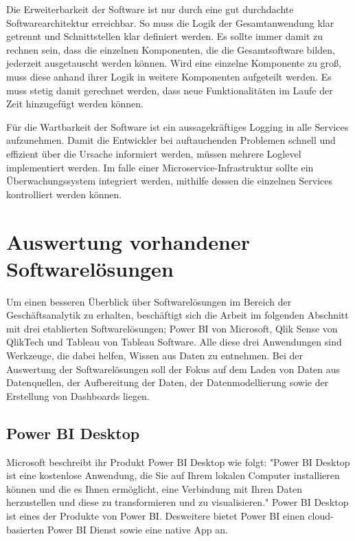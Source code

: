 Die Erweiterbarkeit der Software ist nur durch eine gut durchdachte Softwarearchitektur erreichbar.
So muss die Logik der Gesamtanwendung klar getrennt und Schnittstellen klar definiert werden. Es sollte
immer damit zu rechnen sein, dass die einzelnen Komponenten, die die Gesamtsoftware bilden, jederzeit
ausgetauscht werden können. Wird eine einzelne Komponente zu groß, muss diese anhand ihrer Logik in weitere
Komponenten aufgeteilt werden. Es muss stetig damit gerechnet werden, dass neue Funktionalitäten im
Laufe der Zeit hinzugefügt werden können.

Für die Wartbarkeit der Software ist ein aussagekräftiges Logging in alle Services aufzunehmen.
Damit die Entwickler bei auftauchenden Problemen schnell und effizient über die Ursache informiert werden,
müssen mehrere Loglevel implementiert werden. Im falle einer Microservice-Infrastruktur sollte ein Überwachungssystem
integriert werden, mithilfe dessen die einzelnen Services kontrolliert werden können.

\section{Auswertung vorhandener Softwarelösungen}
\label{sec:auswertungvorhandenersoftwareloesungen}
Um einen besseren Überblick über Softwarelösungen im Bereich der Geschäftsanalytik zu erhalten, beschäftigt sich
die Arbeit im folgenden Abschnitt mit drei etablierten Softwarelösungen; Power BI von
Microsoft, Qlik Sense von QlikTech und Tableau von Tableau Software. Alle diese drei Anwendungen sind Werkzeuge,
die dabei helfen, Wissen aus Daten zu entnehmen. Bei der Auswertung der Softwarelösungen soll der Fokus auf dem Laden
von Daten aus Datenquellen, der Aufbereitung der Daten, der Datenmodellierung sowie der Erstellung von Dashboards liegen.

\subsection{Power BI Desktop}
\label{subsec:powerbidesktop}
Microsoft beschreibt ihr Produkt Power BI Desktop wie folgt: "Power BI Desktop ist eine kostenlose Anwendung,
die Sie auf Ihrem lokalen Computer installieren können und die es Ihnen ermöglicht, eine Verbindung mit Ihren
Daten herzustellen und diese zu transformieren und zu visualisieren."\cite{MicrosoftPowerBIDesktopDocs}
Power BI Desktop ist eines der Produkte von Power BI. Desweitere bietet Power BI einen cloud-basierten Power BI Dienst
sowie eine native App an.\cite{WikiPowerBI}

